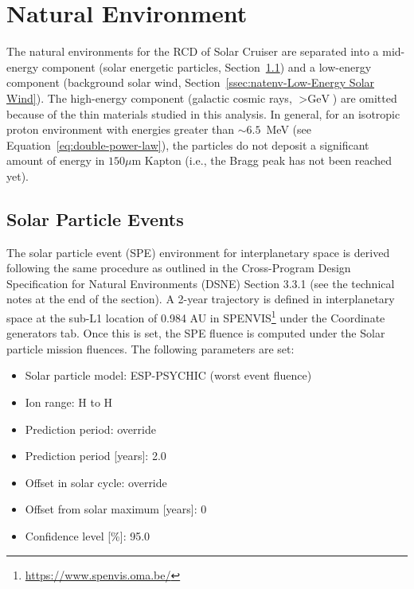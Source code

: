 \documentclass{hitec}
\begin{document}
\section{Natural Environment}

The natural environments for the RCD of Solar Cruiser are separated into a mid-energy component (solar energetic particles, Section~\ref{ssec:natenv-Solar Particle Events}) and a low-energy component (background solar wind, Section~\ref{ssec:natenv-Low-Energy Solar Wind}). The high-energy component (galactic cosmic rays, $> \text{GeV}$) are omitted because of the thin materials studied in this analysis. In general, for an isotropic proton environment with energies greater than $\sim 6.5$~MeV (see Equation~\eqref{eq:double-power-law}), the particles do not deposit a significant amount of energy in $150 \mu$m Kapton (i.e., the Bragg peak has not been reached yet).


\subsection{Solar Particle Events}
\label{ssec:natenv-Solar Particle Events}

The solar particle event (SPE) environment for interplanetary space is derived following the same procedure as outlined in the Cross-Program Design Specification for Natural Environments (DSNE) Section 3.3.1 (see the technical notes at the end of the section). A 2-year trajectory is defined in interplanetary space at the sub-L1 location of 0.984 AU in SPENVIS\footnote{\url{https://www.spenvis.oma.be/}} under the \textsf{Coordinate generators} tab. Once this is set, the SPE fluence is computed under the \textsf{Solar particle mission fluences}. The following parameters are set:
\begin{itemize}
	\item Solar particle model: ESP-PSYCHIC (worst event fluence)
	\item Ion range: H to H
	\item Prediction period: override
	\item Prediction period [years]: 2.0
	\item Offset in solar cycle: override
	\item Offset from solar maximum [years]: 0
	\item Confidence level [\%]: 95.0
\end{itemize}
\end{document}
